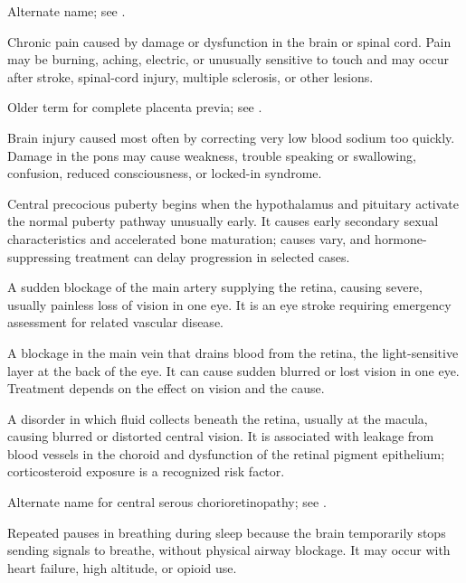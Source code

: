  Alternate name; see .

 Chronic pain caused by damage or dysfunction in the brain or spinal cord. Pain may be burning, aching, electric, or unusually sensitive to touch and may occur after stroke, spinal-cord injury, multiple sclerosis, or other lesions.

 Older term for complete placenta previa; see .

 Brain injury caused most often by correcting very low blood sodium too quickly. Damage in the pons may cause weakness, trouble speaking or swallowing, confusion, reduced consciousness, or locked-in syndrome.

 Central precocious puberty begins when the hypothalamus and pituitary activate the normal puberty pathway unusually early. It causes early secondary sexual characteristics and accelerated bone maturation; causes vary, and hormone-suppressing treatment can delay progression in selected cases.

 A sudden blockage of the main artery supplying the retina, causing severe, usually painless loss of vision in one eye. It is an eye stroke requiring emergency assessment for related vascular disease.

 A blockage in the main vein that drains blood from the retina, the light-sensitive layer at the back of the eye. It can cause sudden blurred or lost vision in one eye. Treatment depends on the effect on vision and the cause.


 A disorder in which fluid collects beneath the retina, usually at the macula, causing blurred or distorted central vision. It is associated with leakage from blood vessels in the choroid and dysfunction of the retinal pigment epithelium; corticosteroid exposure is a recognized risk factor.

 Alternate name for central serous chorioretinopathy; see .

 Repeated pauses in breathing during sleep because the brain temporarily stops sending signals to breathe, without physical airway blockage. It may occur with heart failure, high altitude, or opioid use.

